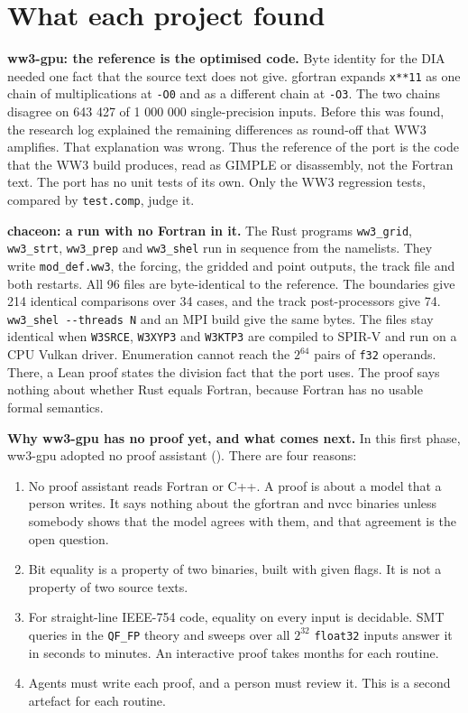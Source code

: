 \documentclass[10pt,a4paper,]{article}
\providecommand{\tightlist}{\setlength{\itemsep}{0pt}\setlength{\parskip}{0pt}}
\begin{document}
\section{What each project found}\label{sec:found}

\textbf{ww3-gpu: the reference is the optimised code.} Byte identity for
the DIA needed one fact that the source text does not give. gfortran
expands \texttt{x**11} as one chain of multiplications at \texttt{-O0}
and as a different chain at \texttt{-O3}. The two chains disagree on 643
427 of 1 000 000 single-precision inputs. Before this was found, the
research log explained the remaining differences as round-off that WW3
amplifies. That explanation was wrong. Thus the reference of the port is
the code that the WW3 build produces, read as GIMPLE or disassembly, not
the Fortran text. The port has no unit tests of its own. Only the WW3
regression tests, compared by \texttt{test.comp}, judge it.

\textbf{chaceon: a run with no Fortran in it.} The Rust programs
\texttt{ww3\_grid}, \texttt{ww3\_strt}, \texttt{ww3\_prep} and
\texttt{ww3\_shel} run in sequence from the namelists. They write
\texttt{mod\_def.ww3}, the forcing, the gridded and point outputs, the
track file and both restarts. All 96 files are byte-identical to the
reference. The boundaries give 214 identical comparisons over 34 cases,
and the track post-processors give 74.
\texttt{ww3\_shel\ -\/-threads\ N} and an MPI build give the same bytes.
The files stay identical when \texttt{W3SRCE}, \texttt{W3XYP3} and
\texttt{W3KTP3} are compiled to SPIR-V and run on a CPU Vulkan driver.
Enumeration cannot reach the \(2^{64}\) pairs of \texttt{f32} operands.
There, a Lean proof states the division fact that the port uses. The
proof says nothing about whether Rust equals Fortran, because Fortran
has no usable formal semantics.

\textbf{Why ww3-gpu has no proof yet, and what comes next.} In this
first phase, ww3-gpu adopted no proof assistant
(). There are four reasons:

\begin{enumerate}
\def\labelenumi{\arabic{enumi}.}
\tightlist
\item
  No proof assistant reads Fortran or C++. A proof is about a model that
  a person writes. It says nothing about the gfortran and nvcc binaries
  unless somebody shows that the model agrees with them, and that
  agreement is the open question.
\item
  Bit equality is a property of two binaries, built with given flags. It
  is not a property of two source texts.
\item
  For straight-line IEEE-754 code, equality on every input is decidable.
  SMT queries in the \texttt{QF\_FP} theory and sweeps over all
  \(2^{32}\) \texttt{float32} inputs answer it in seconds to minutes. An
  interactive proof takes months for each routine.
\item
  Agents must write each proof, and a person must review it. This is a
  second artefact for each routine.
\end{enumerate}
\end{document}
